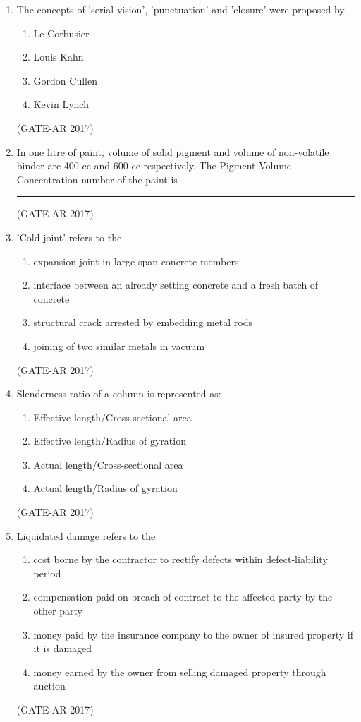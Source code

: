 \documentclass[a4paper,10pt]{article}
\begin{document}
\begin{enumerate}
    \item The concepts of 'serial vision', 'punctuation' and 'closure' were proposed by 
    \begin{multicols}{2}
	\begin{enumerate}
        \item Le Corbusier
        \item Louis Kahn
        \item Gordon Cullen
        \item Kevin Lynch
    \end{enumerate}
	\end{multicols}
    \hfill (GATE-AR 2017)
    
    \item In one litre of paint, volume of solid pigment and volume of non-volatile binder are 400 cc and 600 cc respectively. The Pigment Volume Concentration number of the paint is \rule{2cm}{0.4pt}
    \hfill (GATE-AR 2017)
    
    \item 'Cold joint' refers to the 
    \begin{enumerate}
        \item expansion joint in large span concrete members
        \item interface between an already setting concrete and a fresh batch of concrete
        \item structural crack arrested by embedding metal rods
        \item joining of two similar metals in vacuum
    \end{enumerate}
    \hfill (GATE-AR 2017)

    \item Slenderness ratio of a column is represented as: 
    \begin{multicols}{2}
    \begin{enumerate}
        \item Effective length/Cross-sectional area
        \item Effective length/Radius of gyration
        \item Actual length/Cross-sectional area
        \item Actual length/Radius of gyration
    \end{enumerate}
    \end{multicols}
    \hfill (GATE-AR 2017)

	\item Liquidated damage refers to the 
    \begin{enumerate}
        \item cost borne by the contractor to rectify defects within defect-liability period
        \item compensation paid on breach of contract to the affected party by the other party
        \item money paid by the insurance company to the owner of insured property if it is damaged
        \item money earned by the owner from selling damaged property through auction
    \end{enumerate}
    \hfill (GATE-AR 2017)
    

\end{enumerate}
\end{document}
